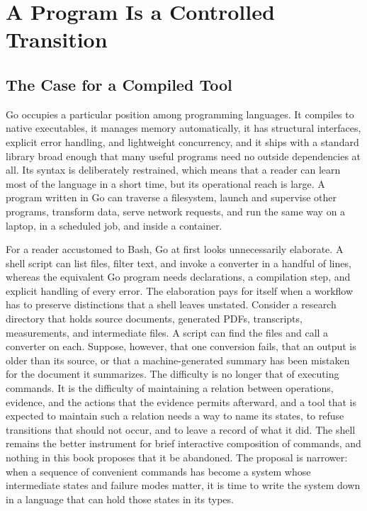 \chapter{A Program Is a Controlled Transition}
\label{ch:transition}

\section{The Case for a Compiled Tool}

Go occupies a particular position among programming languages. It compiles to native executables, it manages memory automatically, it has structural interfaces, explicit error handling, and lightweight concurrency, and it ships with a standard library broad enough that many useful programs need no outside dependencies at all. Its syntax is deliberately restrained, which means that a reader can learn most of the language in a short time, but its operational reach is large. A program written in Go can traverse a filesystem, launch and supervise other programs, transform data, serve network requests, and run the same way on a laptop, in a scheduled job, and inside a container.

For a reader accustomed to Bash, Go at first looks unnecessarily elaborate. A shell script can list files, filter text, and invoke a converter in a handful of lines, whereas the equivalent Go program needs declarations, a compilation step, and explicit handling of every error. The elaboration pays for itself when a workflow has to preserve distinctions that a shell leaves unstated. Consider a research directory that holds source documents, generated PDFs, transcripts, measurements, and intermediate files. A script can find the files and call a converter on each. Suppose, however, that one conversion fails, that an output is older than its source, or that a machine-generated summary has been mistaken for the document it summarizes. The difficulty is no longer that of executing commands. It is the difficulty of maintaining a relation between operations, evidence, and the actions that the evidence permits afterward, and a tool that is expected to maintain such a relation needs a way to name its states, to refuse transitions that should not occur, and to leave a record of what it did. The shell remains the better instrument for brief interactive composition of commands, and nothing in this book proposes that it be abandoned. The proposal is narrower: when a sequence of convenient commands has become a system whose intermediate states and failure modes matter, it is time to write the system down in a language that can hold those states in its types.

